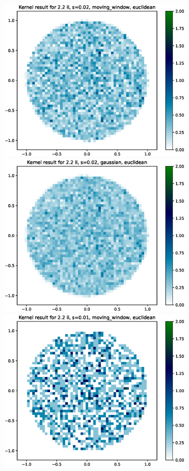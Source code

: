 \documentclass{article}
\begin{document}
\hspace*{-1.5cm}\includegraphics[height=8cm]{comparisons//Kernel_result_2-2ii_s_0-02_moving_window_euclidean.eps} \hspace*{-1.5cm}
\includegraphics[height=8cm]{comparisons//Kernel_result_2-2ii_s_0-02_gaussian_euclidean.eps}  \\
\hspace*{-1.5cm}\includegraphics[height=8cm]{comparisons//Kernel_result_2-2ii_s_0-01_moving_window_euclidean.eps} \hspace*{-1.5cm}
\end{document}
